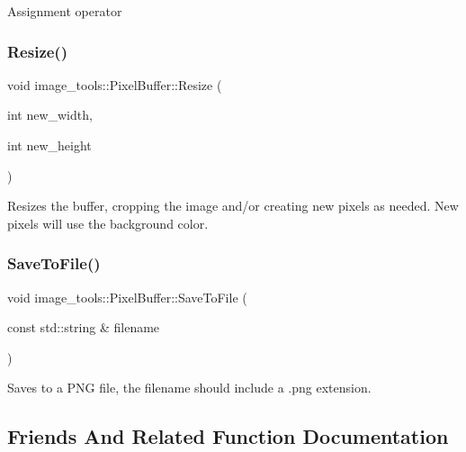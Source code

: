 Assignment operator \mbox{\label{classimage__tools_1_1PixelBuffer_a001dbd44de2d3f19b04180cdbc897b97}} 
\subsubsection{\texorpdfstring{Resize()}{Resize()}}
{\footnotesize\ttfamily void image\+\_\+tools\+::\+Pixel\+Buffer\+::\+Resize (\begin{DoxyParamCaption}\item[{int}]{new\+\_\+width,  }\item[{int}]{new\+\_\+height }\end{DoxyParamCaption})}

Resizes the buffer, cropping the image and/or creating new pixels as needed. New pixels will use the background color. \mbox{\label{classimage__tools_1_1PixelBuffer_ae3f65414f52d3df79c89c88d2a4db288}} 
\subsubsection{\texorpdfstring{Save\+To\+File()}{SaveToFile()}}
{\footnotesize\ttfamily void image\+\_\+tools\+::\+Pixel\+Buffer\+::\+Save\+To\+File (\begin{DoxyParamCaption}\item[{const std\+::string \&}]{filename }\end{DoxyParamCaption})}

Saves to a P\+NG file, the filename should include a .png extension. 

\subsection{Friends And Related Function Documentation}
\mbox{\label{classimage__tools_1_1PixelBuffer_a9751369b6acaba6bc42143cc2b7314ea}} 
